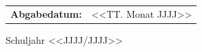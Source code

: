 \begin{titlepage}
  \vspace{1.5cm}

  \begin{tabular}{ll}
    \textbf{Abgabedatum:} & <<TT. Monat JJJJ>> \\
  \end{tabular}

  \vfill

  {\small Schuljahr <<JJJJ/JJJJ>>}

\end{titlepage}

\setcounter{page}{0}
